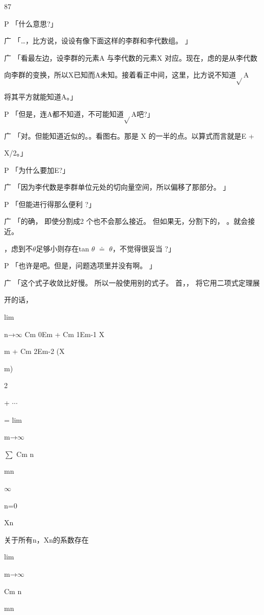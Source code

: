 87\par
P 「什么意思?」\par
广 「…，比方说，设设有像下面这样的李群和李代数组。 」\par
广 「看最左边，设李群的元素A 与李代数的元素X 对应。现在，虑的是从李代数\par
向李群的变换，所以X已知而A未知。接着看正中间，这里，比方说不知道$\sqrt{}$A\par
将其平方就能知道A。」\par
P 「但是，连A都不知道，不可能知道$\sqrt{}$A吧?」\par
广 「对。但能知道近似的。。看图右。那是 X 的一半的点。以算式而言就是E +\par
X/2。」\par
P 「为什么要加E?」\par
广 「因为李代数是李群单位元处的切向量空间，所以偏移了那部分。 」\par
P 「但能进行得那么便利 ?」\par
广 「的确， 即使分割成2 个也不会那么接近。 但如果无，分割下的， 。就会接近。\par
，虑到不$\theta$足够小则存在tan $\theta$ $\doteq$ $\theta$，不觉得很妥当 ?」\par
P 「也许是吧。但是，问题选项里并没有啊。 」\par
广 「这个式子收敛比好慢。 所以一般使用别的式子。 首，， 将它用二项式定理展\par
开的话，\par
lim\par
n→$\infty$ Cm 0Em + Cm 1Em-1 X\par
m + Cm 2Em-2 (X\par
m)\par
2\par
+ $\cdots$\par
= lim\par
m→$\infty$\par
$\sum$ Cm n\par
mn\par
$\infty$\par
n=0\par
Xn\par
关于所有n，Xn的系数存在\par
lim\par
m→$\infty$\par
Cm n\par
mn\par

